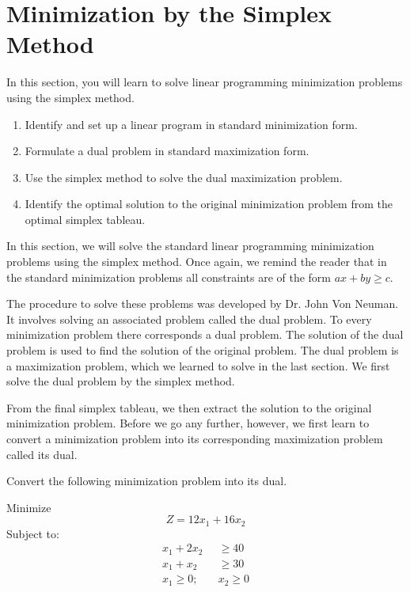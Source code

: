 \section{Minimization by the Simplex Method}
In this section, you will learn to solve linear programming minimization problems using the simplex method.
\begin{enumerate}
    \item Identify and set up a linear program in standard minimization form.
    \item Formulate a dual problem in standard maximization form.
    \item Use the simplex method to solve the dual maximization problem.
    \item Identify the optimal solution to the original minimization problem from the optimal simplex tableau.
\end{enumerate}

In this section, we will solve the standard linear programming minimization problems using the simplex method. Once again, we remind the reader that in the standard minimization problems all constraints are of the form $ax + by \geq c$.

The procedure to solve these problems was developed by Dr. John Von Neuman. It involves solving an associated problem called the dual problem. To every minimization problem there corresponds a dual problem. The solution of the dual problem is used to find the solution of the original problem. The dual problem is a maximization problem, which we learned to solve in the last section. We first solve the dual problem by the simplex method.

From the final simplex tableau, we then extract the solution to the original minimization problem. Before we go any further, however, we first learn to convert a minimization problem into its corresponding maximization problem called its dual.

\begin{example}\label{example_convert_minimization_into_dual}
    Convert the following minimization problem into its dual.

    Minimize
    \[ Z = 12x_1 + 16x_2 \]
    Subject to:
    \begin{align*}
        x_1 + 2x_2        & \geq 40    \\
        x_1 + x_2         & \geq 30    \\
        x_1 \geq 0; \quad & x_2 \geq 0
    \end{align*}
\end{example}

